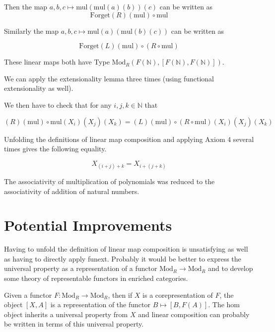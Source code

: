 \documentclass[12pt]{article} %
\theoremstyle{definition}
\theoremstyle{definition}
\theoremstyle{definition}
\theoremstyle{definition}
\begin{document}
Then the map $a, b, c \mapsto \text{mul} (\text{mul} (a)(b))(c)$ can be written as
\begin{equation}
  \text{Forget}(R)(\text{mul}) \circ \text{mul}
\end{equation}

Similarly the map $a, b, c \mapsto \text{mul} (a)(\text{mul} (b)(c))$ can be written as

\begin{equation}
  \text{Forget}(L) (\text{mul}) \circ (R \circ \text{mul})
\end{equation}

These linear maps both have Type $\text{Mod}_R(F(\mathbb{N}), [F(\mathbb{N}), F(\mathbb{N})])$.

We can apply the extensionality lemma three times (using functional extensionality as well).

We then have to check that for any $i, j, k \in \mathbb{N}$ that

\begin{equation}
  (R)(\text{mul}) \circ \text{mul}(X_i)(X_j)(X_k) = (L) (\text{mul}) \circ (R \circ \text{mul})(X_i)(X_j)(X_k)
\end{equation}

Unfolding the definitions of linear map composition and applying Axiom 4 several times gives
the following equality.

\begin{equation}
  X_{(i + j) + k} = X_{i + (j + k)}
\end{equation}

The associativity of multiplication of polynomials was reduced to the associativity of addition
of natural numbers.

\section{Potential Improvements}

Having to unfold the definition of linear map composition is unsatisfying as well as having to
directly apply funext. Probably it would be better to express the universal property as
a representation of a functor $\text{Mod}_R \to \text{Mod}_R$ and to develop some
theory of representable functors in enriched categories.

Given a functor $F : \text{Mod}_R \to \text{Mod}_R$, then if $X$ is a corepresentation of $F$,
the object $[X, A]$ is a representation of the functor $B \mapsto [B, F(A)]$. The hom object
inherits a universal property from $X$ and linear composition can probably be written in terms of this
universal property.
\end{document}
